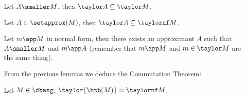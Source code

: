 
\begin{lemma}\label{lem:approx-taylor-subset}
	Let $A\smaller M$, then $\taylor A\subseteq\taylor M$.
\end{lemma}

\begin{lemma}\label{lem:approx_subset_nft}
	Let $A\in\setapprox(M)$, then $\taylor A\subseteq\taylornf M$.
\end{lemma}


\begin{lemma}
	\label{lem:taylor-bohm:nf-imply-in-approx}
	Let $m\app M$ in normal form, then there exists an approximant $A$ such that
	$A\smaller M$ and $m \app A$
	(remember that $m\app M$ and $m\in\taylor M$ are the same thing).
\end{lemma}


From the previous lemmas we deduce the Commutation Theorem:

\begin{theorem}
	\label{thm:taylor-bohm-commute}
	Let $M\in\dbang$. $\taylor{ \btb(M)} =\taylornf M$.
\end{theorem}


